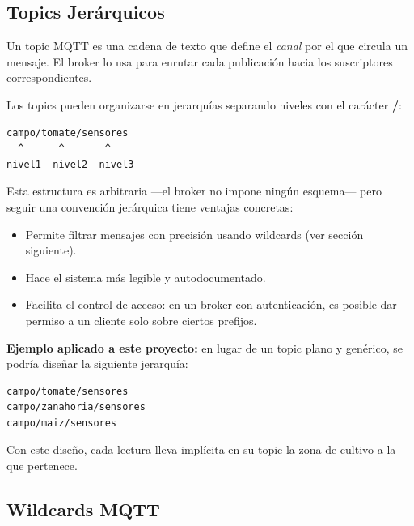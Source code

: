 \documentclass[12pt,a4paper]{article}
\begin{document}
\subsection{Topics Jerárquicos}

Un topic MQTT es una cadena de texto que define el \textit{canal} por el que
circula un mensaje. El broker lo usa para enrutar cada publicación hacia los
suscriptores correspondientes.

Los topics pueden organizarse en jerarquías separando niveles con el
carácter \textbf{/}:

\begin{lstlisting}[style=texto]
campo/tomate/sensores
  ^      ^       ^
nivel1  nivel2  nivel3
\end{lstlisting}

Esta estructura es arbitraria —el broker no impone ningún esquema— pero seguir
una convención jerárquica tiene ventajas concretas:

\begin{itemize}
  \item Permite filtrar mensajes con precisión usando wildcards (ver sección
        siguiente).
  \item Hace el sistema más legible y autodocumentado.
  \item Facilita el control de acceso: en un broker con autenticación,
        es posible dar permiso a un cliente solo sobre ciertos prefijos.
\end{itemize}

\textbf{Ejemplo aplicado a este proyecto:} en lugar de un topic plano y genérico,
se podría diseñar la siguiente jerarquía:

\begin{lstlisting}[style=texto]
campo/tomate/sensores
campo/zanahoria/sensores
campo/maiz/sensores
\end{lstlisting}

Con este diseño, cada lectura lleva implícita en su topic la zona de cultivo a
la que pertenece.

\subsection{Wildcards MQTT}
\end{document}
